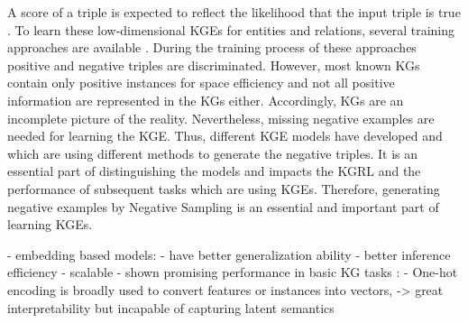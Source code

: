 A score of a triple is expected to reflect the likelihood that the input triple is true \cite{ConvE, qiannegative}.
To learn these low-dimensional \acp{KGE} for entities and relations, several training approaches are available \cite{Ruffinelli2020You}.
During the training process of these approaches positive and negative triples are discriminated.
However, most known \acp{KG} contain only positive instances for space efficiency \cite{qiannegative} and not all positive information are represented in the \acp{KG} either.
Accordingly, \acp{KG} are an incomplete picture of the reality.
Nevertheless, missing negative examples are needed for learning the \ac{KGE}.
Thus, different \ac{KGE} models have developed and which are using different methods to generate the negative triples.
It is an essential part of distinguishing the models \cite{Ruffinelli2020You} and impacts the \ac{KGRL} and the performance of subsequent tasks which are using \acp{KGE}. 
Therefore, generating negative examples by Negative Sampling is an essential and important part of learning \acp{KGE}.





- embedding based models:
    - have better generalization ability
    - better inference efficiency
    - scalable
    - shown promising performance in basic KG tasks
\cite{qianunderstanding}:
- One-hot encoding is broadly used to convert features or instances into vectors,
-> great interpretability but incapable of capturing latent semantics













